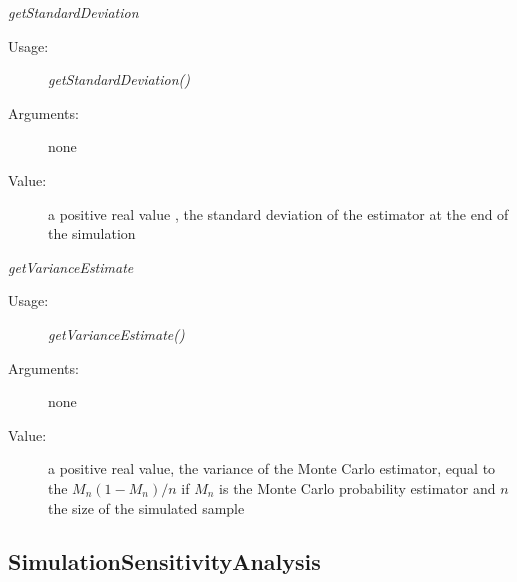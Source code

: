 \begin{description}
\begin{description}
\item \textit{getStandardDeviation}
\begin{description}
\item[Usage:] \textit{getStandardDeviation()}
\item[Arguments:] none
\item[Value:]  a positive real value , the standard deviation  of the estimator at the end of the simulation
\end{description}
\bigskip

\item \textit{getVarianceEstimate}
\begin{description}
\item[Usage:] \textit{getVarianceEstimate()}
\item[Arguments:] none
\item[Value:]  a positive real value, the variance of the Monte Carlo estimator, equal to the $M_n(1-M_n) / n$ if $M_n$ is the Monte Carlo probability estimator and $n$ the size of the simulated sample
\end{description}
\bigskip
\end{description}

\end{description}


\newpage
\subsection{SimulationSensitivityAnalysis}


